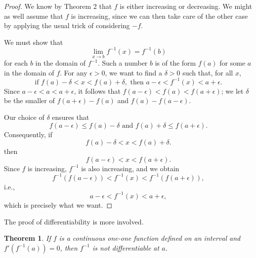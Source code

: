 \documentclass{article}
\newtheorem{theorem}{Theorem}
\begin{document}
\begin{proof}
  We know by Theorem 2 that $f$ is either increasing or decreasing. We might as
  well assume that $f$ is increasing, since we can then take care of the other
  case by applying the usual trick of considering $-f$.

  We must show that \begin{equation*}
    \lim_{x \rightarrow b}f^{-1}(x) = f^{-1}(b)
  \end{equation*} for each $b$ in the domain of $f^{-1}$. Such a number $b$ is
  of the form $f(a)$ for some $a$ in the domain of $f$. For any $\epsilon > 0$,
  we want to find a $\delta > 0$ such that, for all $x$, \begin{equation*}
    \text{if } f(a) - \delta < x < f(a) + \delta, \text{ then } a - \epsilon <
      f^{-1}(x) < a + \epsilon.
  \end{equation*} Since $a - \epsilon < a < a + \epsilon$, it follows that
  $f(a - \epsilon) < f(a) < f(a + \epsilon)$; we let $\delta$ be the smaller of
  $f(a + \epsilon) - f(a)$ and $f(a) - f(a - \epsilon)$.

  Our choice of $\delta$ ensures that \begin{equation*}
    f(a - \epsilon) \leq f(a) - \delta \text{ and } f(a) + \delta \leq f(a +
      \epsilon).
  \end{equation*} Consequently, if \begin{equation*}
    f(a) - \delta < x < f(a) + \delta.
  \end{equation*} then \begin{equation*}
    f(a - \epsilon) < x < f(a + \epsilon).
  \end{equation*} Since $f$ is increasing, $f^{-1}$ is also increasing, and we
  obtain \begin{equation*}
    f^{-1}(f(a - \epsilon)) < f^{-1}(x) < f^{-1}(f(a + \epsilon)),
  \end{equation*} i.e., \begin{equation*}
    a - \epsilon < f^{-1}(x) < a + \epsilon,
  \end{equation*} which is precisely what we want.
\end{proof}

The proof of differentiability is more involved.

\begin{theorem}
  If $f$ is a continuous one-one function defined on an interval and $f'(f^{-1}
  (a)) = 0$, then $f^{-1}$ is \emph{not} differentiable at $a$.
\end{theorem}
\end{document}
